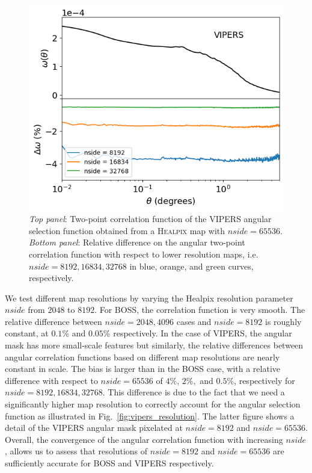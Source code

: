 \documentclass{aa}
\begin{document}
\begin{figure}
    \includegraphics[width=\columnwidth]{Figures/wtheta_map_VIPERS_W1_65536.png} 
    \caption{\emph{Top panel}: Two-point correlation function of the VIPERS angular selection function obtained from a \textsc{Healpix} map with $nside = 65536$. \emph{Bottom panel}: Relative difference on the angular two-point correlation function with respect to lower resolution maps, i.e. $nside = 8192, 16834, 32768$ in blue, orange, and green curves, respectively.}
    \label{fig:VIPERS_wtheta}
\end{figure}
%
We test different map resolutions by varying the {\sc Healpix} resolution parameter $nside$ from $2048$ to $8192$.
For BOSS, the correlation function is very smooth. The relative difference between
$nside = 2048, 4096$ cases and $nside = 8192$ is roughly constant, at $0.1\%$ and $0.05\%$ respectively. In the case of VIPERS, the angular mask has more small-scale features but similarly, the relative differences between angular correlation functions based on different map resolutions are nearly constant in scale. The bias is larger than in the BOSS case, with a relative difference with respect to $nside = 65536$ of $4\%$, $2\%,$ and $0.5\%$, respectively for $nside = 8192, 16834, 32768$. This difference is due to the fact that we need a significantly higher map resolution to correctly account for the angular selection function as illustrated in Fig.~\ref{fig:vipers_resolution}. The latter figure shows a detail of the VIPERS angular mask pixelated at $nside=8192$ and $nside=65536$. Overall, the convergence of the angular correlation function with increasing $nside$, allows us to assess that resolutions of $nside = 8192$ and $nside = 65536$ are sufficiently accurate for BOSS and VIPERS respectively.
\end{document}
